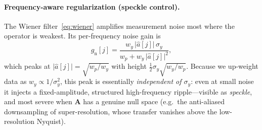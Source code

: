 \documentclass[11pt]{article}
\newcommand{\A}{\mathbf{A}}
\begin{document}
\paragraph{Frequency-aware regularization (speckle control).}
The Wiener filter~\eqref{eq:wiener} amplifies measurement noise most where the operator is
weakest. Its per-frequency noise gain is
\begin{equation}
g_{\mathrm{n}}[j]=\frac{w_y\,\lvert\hat a[j]\rvert\,\sigma_y}{w_p+w_y\,\lvert\hat a[j]\rvert^{2}},
\label{eq:noisegain}
\end{equation}
which peaks at $\lvert\hat a[j]\rvert=\sqrt{w_p/w_y}$ with height $\tfrac12\sigma_y\sqrt{w_y/w_p}$.
Because we up-weight data as $w_y\!\propto\!1/\sigma_y^{2}$, this peak is essentially
\emph{independent of $\sigma_y$}: even at small noise it injects a fixed-amplitude, structured
high-frequency ripple---visible as \emph{speckle}, and most severe when $\A$ has a genuine null
space (e.g.\ the anti-aliased downsampling of super-resolution, whose transfer vanishes above the
low-resolution Nyquist).
\end{document}
